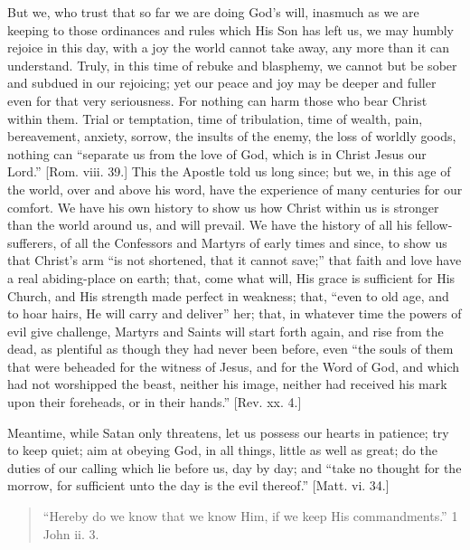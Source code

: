But we, who trust that so far we are doing God's will, inasmuch as we
are keeping to those ordinances and rules which His Son has left us, we
may humbly rejoice in this day, with a joy the world cannot take away,
any more than it can understand. Truly, in this time of rebuke and
blasphemy, we cannot but be sober and subdued in our rejoicing; yet our
peace and joy may be deeper and fuller even for that very seriousness.
For nothing can harm those who bear Christ within them. Trial or
temptation, time of tribulation, time of wealth, pain, bereavement,
anxiety, sorrow, the insults of the enemy, the loss of worldly goods,
nothing can ``separate us from the love of God, which is in Christ
Jesus our Lord.'' [Rom. viii. 39.] This the Apostle told us long
since; but we, in this age of the world, over and above his word, have
the experience of many centuries for our comfort. We have his own
history to show us how Christ within us is stronger than the world
around us, and will prevail. We have the history of all his
fellow-sufferers, of all the Confessors and Martyrs of early times and
since, to show us that Christ's arm ``is not shortened, that it
cannot save;'' that faith and love have a real abiding-place on
earth; that, come what will, His grace is sufficient for His Church, and
His strength made perfect in weakness; that, ``even to old age, and
to hoar hairs, He will carry and deliver'' her; that, in whatever
time the powers of evil give challenge, Martyrs and Saints will start
forth again, and rise from the dead, as plentiful as though they had
never been before, even ``the souls of them that were beheaded for
the witness of Jesus, and for the Word of God, and which had not
worshipped the beast, neither his image, neither had received his mark
upon their foreheads, or in their hands.'' [Rev. xx. 4.]

Meantime, while Satan only threatens, let us possess our hearts in
patience; try to keep quiet; aim at obeying God, in all things, little
as well as great; do the duties of our calling which lie before us, day
by day; and ``take no thought for the morrow, for sufficient unto
the day is the evil thereof.'' [Matt. vi. 34.]


\begin{quote}

``Hereby do we know that we know Him, if we keep His
commandments.'' 1 John ii. 3.

\end{quote}

